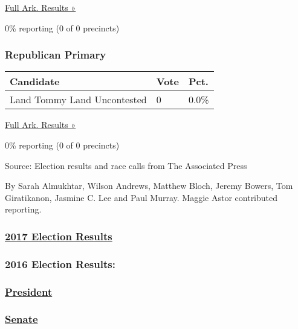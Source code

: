 \href{https://www.nytimes3xbfgragh.onion/elections/results/arkansas}{Full
Ark. Results »}

0\% reporting (0 of 0 precincts)

\hypertarget{republican-primary-10}{%
\subsubsection{Republican Primary}\label{republican-primary-10}}

\begin{longtable}[]{@{}lll@{}}
\toprule
Candidate & Vote & Pct.\tabularnewline
\midrule
\endhead
 Land Tommy Land Uncontested & 0 & 0.0\%\tabularnewline
\bottomrule
\end{longtable}

\href{https://www.nytimes3xbfgragh.onion/elections/results/arkansas}{Full
Ark. Results »}

0\% reporting (0 of 0 precincts)

Source: Election results and race calls from The Associated Press

By Sarah Almukhtar, Wilson Andrews, Matthew Bloch, Jeremy Bowers, Tom
Giratikanon, Jasmine C. Lee and Paul Murray. Maggie Astor contributed
reporting.

\hypertarget{2017-election-results}{%
\subsubsection{\texorpdfstring{\href{https://www.nytimes3xbfgragh.onion/interactive/2017/us/elections/election-calendar.html}{2017
Election Results}}{2017 Election Results}}\label{2017-election-results}}

\hypertarget{2016-election-results}{%
\subsubsection{2016 Election Results:}\label{2016-election-results}}

\hypertarget{president}{%
\subsubsection{\texorpdfstring{\href{https://www.nytimes3xbfgragh.onion/elections/results/president}{President}}{President}}\label{president}}

\hypertarget{senate}{%
\subsubsection{\texorpdfstring{\href{https://www.nytimes3xbfgragh.onion/elections/results/senate}{Senate}}{Senate}}\label{senate}}

